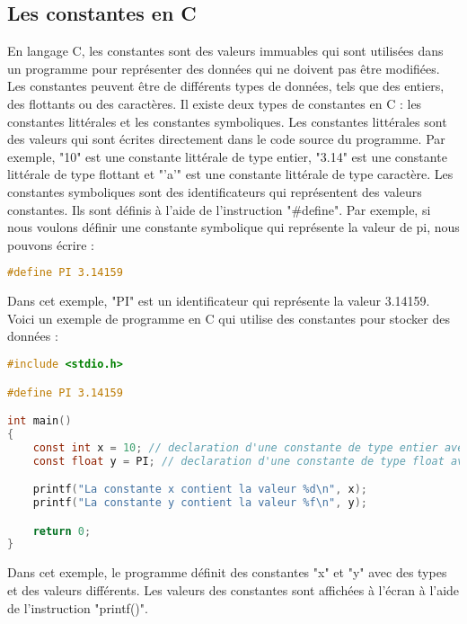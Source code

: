 \documentclass{uofa-eng-assignment}
\begin{document}
\subsection{Les constantes en C}
En langage C, les constantes sont des valeurs immuables qui sont utilisées dans un programme pour représenter des données qui ne doivent pas être modifiées. Les constantes peuvent être de différents types de données, tels que des entiers, des flottants ou des caractères.
\newline \newline
Il existe deux types de constantes en C : les constantes littérales et les constantes symboliques.
\newline \newline
Les constantes littérales sont des valeurs qui sont écrites directement dans le code source du programme. Par exemple, "10" est une constante littérale de type entier, "3.14" est une constante littérale de type flottant et "'a'" est une constante littérale de type caractère.
\newline \newline
Les constantes symboliques sont des identificateurs qui représentent des valeurs constantes. Ils sont définis à l'aide de l'instruction "\#define". Par exemple, si nous voulons définir une constante symbolique qui représente la valeur de pi, nous pouvons écrire :
\begin{lstlisting}[language=C]
#define PI 3.14159
\end{lstlisting}

\noindent \newline
Dans cet exemple, "PI" est un identificateur qui représente la valeur 3.14159.
\newline \newline
Voici un exemple de programme en C qui utilise des constantes pour stocker des données :

\begin{lstlisting}[language=C]
#include <stdio.h>

#define PI 3.14159

int main()
{
    const int x = 10; // declaration d'une constante de type entier avec une valeur de 10
    const float y = PI; // declaration d'une constante de type float avec la valeur de la constante symbolique PI

    printf("La constante x contient la valeur %d\n", x);
    printf("La constante y contient la valeur %f\n", y);

    return 0;
}
\end{lstlisting}
\noindent \newline
Dans cet exemple, le programme définit des constantes "x" et "y" avec des types et des valeurs différents. Les valeurs des constantes sont affichées à l'écran à l'aide de l'instruction "printf()".
\end{document}
